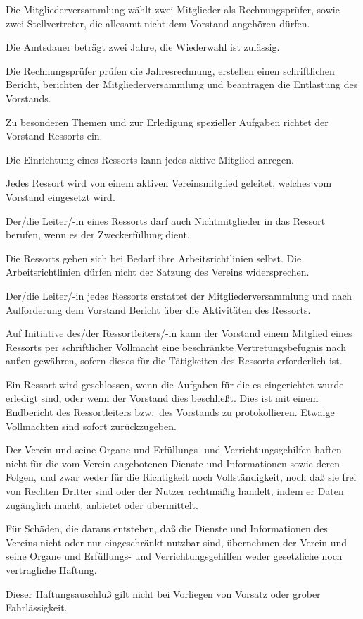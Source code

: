 \documentclass[draft]{scrartcl}
\begin{document}
\begin{contract}

Die Mitgliederversammlung wählt zwei Mitglieder als Rechnungsprüfer, sowie
zwei Stellvertreter, die allesamt nicht dem Vorstand angehören dürfen.

Die Amtsdauer beträgt zwei Jahre, die Wiederwahl ist zulässig.

Die Rechnungsprüfer prüfen die Jahresrechnung, erstellen einen schriftlichen
Bericht, berichten der Mitgliederversammlung und beantragen die Entlastung
des Vorstands.


Zu besonderen Themen und zur Erledigung spezieller Aufgaben richtet der
Vorstand Ressorts ein.

Die Einrichtung eines Ressorts kann jedes aktive Mitglied anregen.

Jedes Ressort wird von einem aktiven Vereinsmitglied geleitet, welches vom
Vorstand eingesetzt wird.

Der/die Leiter/-in eines Ressorts darf auch Nichtmitglieder in das Ressort
berufen, wenn es der Zweckerfüllung dient.

Die Ressorts geben sich bei Bedarf ihre Arbeitsrichtlinien selbst. Die
Arbeitsrichtlinien dürfen nicht der Satzung des Vereins widersprechen.

Der/die Leiter/-in jedes Ressorts erstattet der Mitgliederversammlung und nach
Auf\/\-for\-derung dem Vorstand Bericht über die Aktivitäten des Ressorts.

Auf Initiative des/der Ressortleiters/-in kann der Vorstand einem Mitglied
eines Ressorts per schriftlicher Vollmacht eine beschränkte
Vertretungsbefugnis nach außen gewähren, sofern dieses für die Tätigkeiten des
Ressorts erforderlich ist.

Ein Ressort wird geschlossen, wenn die Aufgaben für die es eingerichtet wurde
erledigt sind, oder wenn der Vorstand dies beschließt. Dies ist mit einem
Endbericht des Ressortleiters bzw.\ des Vorstands zu protokollieren. Etwaige
Vollmachten sind sofort zurückzugeben.


Der Verein und seine Organe und Erfüllungs- und Verrichtungsgehilfen haften
nicht für die vom Verein angebotenen Dienste und Informationen sowie deren
Folgen, und zwar weder für die Richtigkeit noch Vollständigkeit, noch daß sie
frei von Rechten Dritter sind oder der Nutzer rechtmäßig handelt, indem er
Daten zugänglich macht, anbietet oder übermittelt.

Für Schäden, die daraus entstehen, daß die Dienste und Informationen des
Vereins nicht oder nur eingeschränkt nutzbar sind, übernehmen der Verein und
seine Organe und Erfüllungs- und Verrichtungsgehilfen weder gesetzliche noch
vertragliche Haftung.

Dieser Haftungsauschluß gilt nicht bei Vorliegen von Vorsatz oder grober
Fahr\-läss\-ig\-keit.

\end{contract}
\end{document}
